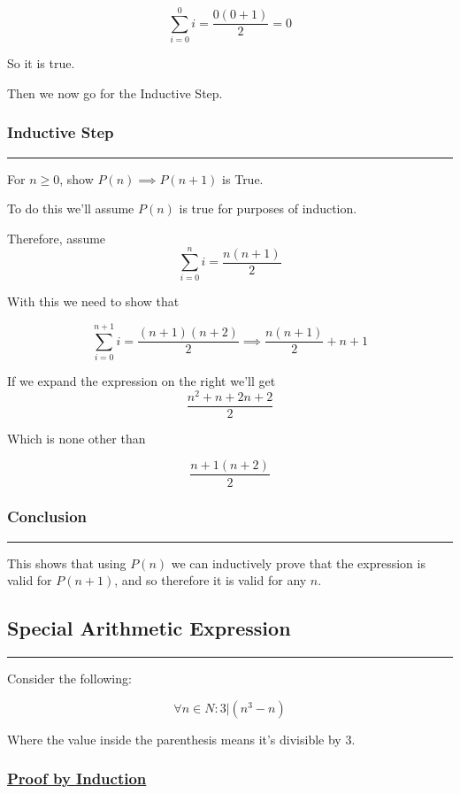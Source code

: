 \documentclass{article}
\begin{document}
\[\sum_{i=0}^{0} i = \frac{0(0+1)}{2} = 0\]

So it is true.

Then we now go for the Inductive Step.

\subsubsection*{Inductive Step}
\hrule
\vspace{0.2cm}
For $n \geq 0$, show $P(n) \implies
P(n+1)$ is True.

To do this we'll assume $P(n)$ is true for purposes of
induction. 

Therefore, assume \[\sum_{i=0}^{n} i = \frac{n(n+1)}{2}\]

With this we need to show that

\[\sum_{i=0}^{n+1} i = \frac{(n+1)(n+2)}{2}
\implies \frac{n(n+1)}{2} + n+1\]

If we expand the expression on the right
we'll get
\[\frac{n^{2} + n + 2n + 2}{2}\]

Which is none other than

\[\frac{n+1(n+2)}{2}\]

\subsubsection*{Conclusion}
\hrule
\vspace{0.2cm}
This shows that using $P(n)$
we can inductively prove that the
expression is valid for $P(n+1)$,
and so therefore it is valid for any $n$.

\newpage
\noindent
\subsection{Special Arithmetic Expression}
\hrule
\vspace{0.2cm}
Consider the following:

\[\forall n \in N : 3|(n^{3}-n)\]

\begin{center}
Where the value inside the parenthesis
means it's divisible by 3.
\end{center}

\vspace{0.2cm}
\subsubsection*{\underline{Proof by Induction}}
\vspace{0.2cm}
\end{document}
